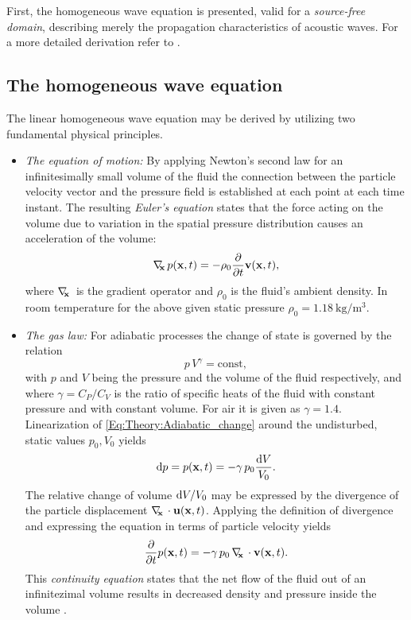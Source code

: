 First, the homogeneous wave equation is presented, valid for a \emph{source-free domain}, describing merely the propagation characteristics of acoustic waves.
For a more detailed derivation refer to \cite{Morse1968, Beranek1993, Williams1999, Blackstock2000}.

\subsection{The homogeneous wave equation}
%
The linear homogeneous wave equation may be derived by utilizing two fundamental physical principles.
\begin{itemize}
\item \emph{The equation of motion:} By applying Newton's second law for an infinitesimally small volume of the fluid the connection between the particle velocity vector and the pressure field is established at each point at each time instant. 
The resulting \emph{Euler's equation} states that the force acting on the volume due to variation in the spatial pressure distribution causes an acceleration of the volume:
\begin{equation}
\nabla_{\!\!\mathbf{x}}\, p(\mathbf{x},t) = -\rho_0 \frac{\partial}{\partial t} \mathbf{v}(\mathbf{x},t),
\label{Eq:Theory:Eulers_equation}
\end{equation}
where $\nabla_{\!\!\mathbf{x}}\,$ is the gradient operator and $\rho_0$ is the fluid's ambient density. 
In room temperature for the above given static pressure $\rho_0 = 1.18~\mathrm{kg}/\mathrm{m}^3$.

\item \emph{The gas law:} For adiabatic processes the change of state is governed by the relation
\begin{equation}
p \, V^{\gamma} = \mathrm{const},
\label{Eq:Theory:Adiabatic_change}
\end{equation}
with $p$ and $V$ being the pressure and the volume of the fluid respectively, and where $\gamma = C_P/C_V$ is the ratio of specific heats of the fluid with constant pressure and with constant volume.
For air it is given as $\gamma = 1.4$.
Linearization of \eqref{Eq:Theory:Adiabatic_change} around the undisturbed, static values $p_0, V_0$ yields
\begin{equation}
\mathrm{d} p = p(\mathbf{x},t) = -\gamma \, p_0 \frac{\mathrm{d} V}{V_0}.
\end{equation}
The relative change of volume $\mathrm{d} V / V_0$ may be expressed by the divergence of the particle displacement $\nabla_{\!\!\mathbf{x}}\, \cdot \mathbf{u}(\mathbf{x},t)$. 
Applying the definition of divergence and expressing the equation in terms of particle velocity yields
\begin{equation}
\frac{\partial}{\partial t} p(\mathbf{x},t) = -\gamma \, p_0 \, \nabla_{\!\!\mathbf{x}}\, \cdot \mathbf{v}(\mathbf{x},t).
\label{Eq:Theory:continuity_eq}
\end{equation}
This \emph{continuity equation} states that the net flow of the fluid out of an infinitezimal volume results in decreased density and pressure inside the volume \cite{Arfken2005}.
\end{itemize}
